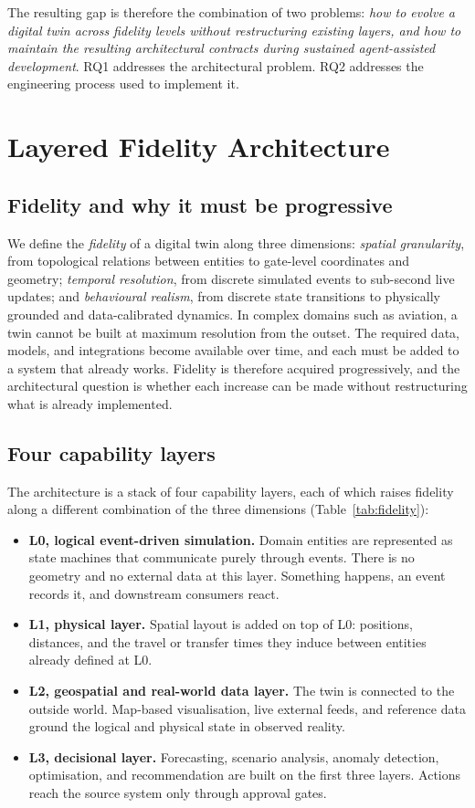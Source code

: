 \documentclass[runningheads]{llncs}
\begin{document}
The resulting gap is therefore the combination of two problems: \emph{how to evolve a digital twin across fidelity levels without restructuring existing layers, and how to maintain the resulting architectural contracts during sustained agent-assisted development}. RQ1 addresses the architectural problem. RQ2 addresses the engineering process used to implement it.

\section{Layered Fidelity Architecture}\label{sec:architecture}

\subsection{Fidelity and why it must be progressive}

We define the \emph{fidelity} of a digital twin along three dimensions: \emph{spatial granularity}, from topological relations between entities to gate-level coordinates and geometry; \emph{temporal resolution}, from discrete simulated events to sub-second live updates; and \emph{behavioural realism}, from discrete state transitions to physically grounded and data-calibrated dynamics. In complex domains such as aviation, a twin cannot be built at maximum resolution from the outset. The required data, models, and integrations become available over time, and each must be added to a system that already works. Fidelity is therefore acquired progressively, and the architectural question is whether each increase can be made without restructuring what is already implemented.

\subsection{Four capability layers}

The architecture is a stack of four capability layers, each of which raises fidelity along a different combination of the three dimensions (Table~\ref{tab:fidelity}):

\begin{itemize}
\item \textbf{L0, logical event-driven simulation.} Domain entities are represented as state machines that communicate purely through events. There is no geometry and no external data at this layer. Something happens, an event records it, and downstream consumers react.
\item \textbf{L1, physical layer.} Spatial layout is added on top of L0: positions, distances, and the travel or transfer times they induce between entities already defined at L0.
\item \textbf{L2, geospatial and real-world data layer.} The twin is connected to the outside world. Map-based visualisation, live external feeds, and reference data ground the logical and physical state in observed reality.
\item \textbf{L3, decisional layer.} Forecasting, scenario analysis, anomaly detection, optimisation, and recommendation are built on the first three layers. Actions reach the source system only through approval gates.
\end{itemize}
\end{document}
